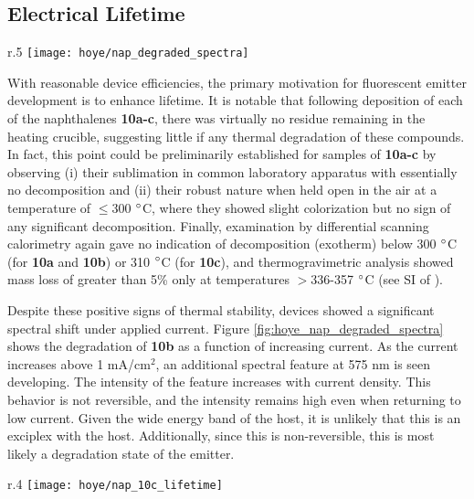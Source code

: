 \documentclass[../thesis.tex]{subfiles}
\begin{document}
\subsection{Electrical Lifetime}

\begin{wrapfigure}{r}{.5\textwidth}
\centering
\texttt{[image: hoye/nap\_degraded\_spectra]}
\caption{Spectral degradation of \textbf{10b} under applied current. Spectra were taken in the order of the legend.}
\label{fig:hoye_nap_degraded_spectra}
\end{wrapfigure}

With reasonable device efficiencies, the primary motivation for fluorescent emitter development is to enhance lifetime.
It is notable that following deposition of each of the naphthalenes \textbf{10a-c}, there was virtually no residue remaining in the heating crucible, suggesting little if any thermal degradation of these compounds. 
In fact, this point could be preliminarily established for samples of \textbf{10a-c} by observing (i) their sublimation in common laboratory apparatus with essentially no decomposition and (ii) their robust nature when held open in the air at a temperature of $\le$300 $\degree$C, where they showed slight colorization but no sign of any significant decomposition. 
Finally, examination by differential scanning calorimetry again gave no indication of decomposition (exotherm) below 300 $\degree$C (for \textbf{10a} and \textbf{10b}) or 310 $\degree$C (for \textbf{10c}), and thermogravimetric analysis showed mass loss of greater than 5\% only at temperatures $>$336-357 $\degree$C (see SI of \textcite{Xu2016}). 

Despite these positive signs of thermal stability, devices showed a significant spectral shift under applied current.
Figure \ref{fig:hoye_nap_degraded_spectra} shows the degradation of \textbf{10b} as a function of increasing current.
As the current increases above 1 mA/cm$^2$, an additional spectral feature at 575 nm is seen developing.  
The intensity of the feature increases with current density.
This behavior is not reversible, and the intensity remains high even when returning to low current.  
Given the wide energy band of the host, it is unlikely that this is an exciplex with the host.
Additionally, since this is non-reversible, this is most likely a degradation state of the emitter.

\begin{wrapfigure}{r}{.4\textwidth}
\centering
\texttt{[image: hoye/nap\_10c\_lifetime]}
\caption{Lifetime of molecule \textbf{10c}.}
\label{fig:hoye_10c_lifetime}
\end{wrapfigure}
\end{document}
